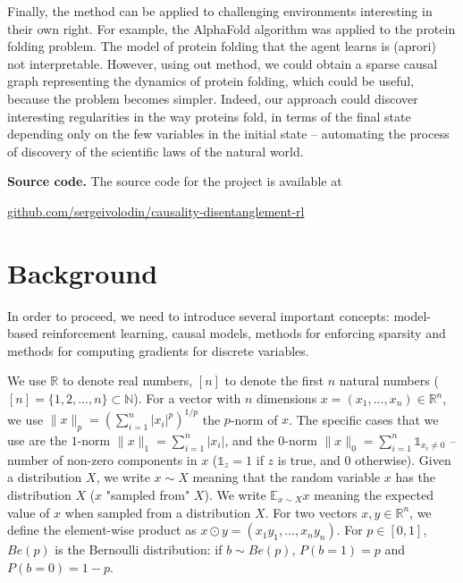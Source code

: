 \documentclass[a4paper,11pt,oneside]{report}
\begin{document}
Finally, the method can be applied to challenging environments interesting in their own right. For example, the AlphaFold algorithm was applied to the protein folding problem. The model of protein folding that the agent learns is (aprori) not interpretable. However, using out method, we could obtain a sparse causal graph representing the dynamics of protein folding, which could be useful, because the problem becomes simpler. Indeed, our approach could discover interesting regularities in the way proteins fold, in terms of the final state depending only on the few variables in the initial state -- automating the process of discovery of the scientific laws of the natural world.

{\bf Source code.} The source code for the project is available at
\begin{center}
\href{https://github.com/sergeivolodin/causality-disentanglement-rl}{github.com/sergeivolodin/causality-disentanglement-rl}
\end{center}

\chapter{Background}
\label{ch:background}

In order to proceed, we need to introduce several important concepts: model-based reinforcement learning, causal models, methods for enforcing sparsity and methods for computing gradients for discrete variables.

We use $\mathbb R$ to denote real numbers, $[n]$ to denote the first $n$ natural numbers ($[n]=\{1, 2, ..., n\}\subset \mathbb N$). For a vector with $n$ dimensions $x=(x_1,...,x_n)\in \mathbb R^n$, we use $\|x\|_p=\left(\sum_{i=1}^n|x_i|^p\right)^{1/p}$ the $p$-norm of $x$. The specific cases that we use are the $1$-norm $\|x\|_1=\sum\limits_{i=1}^n|x_i|$, and the $0$-norm $\|x\|_0=\sum\limits_{i=1}^n\mathds 1_{x_i\neq 0}$ -- number of non-zero components in $x$ ($\mathds 1_z=1$ if $z$ is true, and $0$ otherwise).
Given a distribution $X$, we write $x\sim X$ meaning that the random variable $x$ has the distribution $X$ ($x$ "sampled from" $X$). We write $\mathbb E_{x\sim X} x$ meaning the expected value of $x$ when sampled from a distribution $X$. For two vectors $x,y\in\mathbb R^{n}$, we define the element-wise product as $x\odot y=(x_1y_1,...,x_ny_n)$. For $p\in[0,1]$, $Be(p)$ is the Bernoulli distribution: if $b\sim Be(p)$, $P(b=1)=p$ and $P(b=0)=1-p$.
\end{document}
